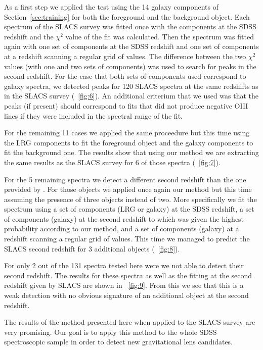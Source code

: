 \documentclass[12pt,preprint]{aastex}
\newcommand{\sectionname}{Section}
\begin{document}
As a first step we applied the test using the 14 galaxy components of
\sectionname~\ref{sec:training} for both the foreground and the
background object. Each spectrum of the SLACS survey was fitted once
with the components at the SDSS redshift and the $\chi^2$ value of the
fit was calculated. Then the spectrum was fitted again with one set of
components at the SDSS redshift and one set of components at a
redshift scanning a regular grid of values. The difference between the
two $\chi^2$ values (with one and two sets of components) was used to
search for peaks in the second redshift. For the case that both sets
of components used correspond to galaxy spectra, we detected peaks for
120 SLACS spectra at the same redshifts as in the SLACS survey
(\figurename~\ref{fig:6}). An additional criterium that we used was
that the peaks (if present) should correspond to fits that did not
produce negative OIII lines if they were included in the spectral
range of the fit.

For the remaining 11 cases we applied the same proceedure but this
time using the LRG components to fit the foreground object and the
galaxy components to fit the background one. The results show that
using our method we are extracting the same results as the SLACS
survey for 6 of those spectra (\figurename~\ref{fig:7}).

For the 5 remaining spectra we detect a different second redshift than
the one provided by \cite{bolton}. For those objects we applied once
again our method but this time assuming the presence of three objects
instead of two. More specifically we fit the spectrum using a set of
components (LRG or galaxy) at the SDSS redshift, a set of components
(galaxy) at the second redshift to which was given the highest
probability according to our method, and a set of components (galaxy)
at a redshift scanning a regular grid of values. This time we managed
to predict the SLACS second redshift for 3 additional objects
(\figurename~\ref{fig:8}).

For only 2 out of the 131 spectra tested here were we not able to
detect their second redshift. The results for these spectra as well as
the fitting at the second redshift given by SLACS are shown in
\figurename~\ref{fig:9}. From this \figurename we see that this is a
weak detection with no obvious signature of an additional object at
the second redshift.

The results of the method presented here when applied to the SLACS
survey are very promising. Our goal is to apply this method to the
whole SDSS spectroscopic sample in order to detect new gravitational
lens candidates.
\end{document}
